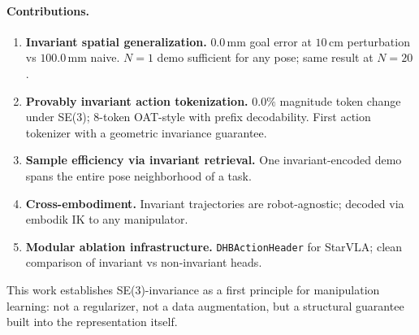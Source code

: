 \paragraph{Contributions.}
\begin{enumerate}
\item \textbf{Invariant spatial generalization.}
$0.0\,\text{mm}$ goal error at $10\,\text{cm}$ perturbation vs $100.0\,\text{mm}$ naive.
$N{=}1$ demo sufficient for any pose; same result at $N{=}20$.

\item \textbf{Provably invariant action tokenization.}
$0.0\%$ magnitude token change under SE(3); 8-token OAT-style with prefix decodability.
First action tokenizer with a geometric invariance guarantee.

\item \textbf{Sample efficiency via invariant retrieval.}
One invariant-encoded demo spans the entire pose neighborhood of a task.

\item \textbf{Cross-embodiment.}
Invariant trajectories are robot-agnostic; decoded via embodik IK to any manipulator.

\item \textbf{Modular ablation infrastructure.}
\texttt{DHBActionHeader} for StarVLA; clean comparison of invariant vs non-invariant heads.
\end{enumerate}

This work establishes SE(3)-invariance as a first principle for manipulation learning:
not a regularizer, not a data augmentation, but a structural guarantee built into
the representation itself.
